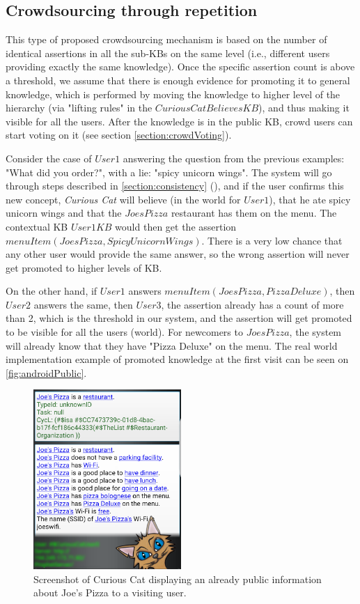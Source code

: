 \subsection{Crowdsourcing through repetition}
\label{section:crowdRepetition}
This type of proposed crowdsourcing mechanism is based on the number of 
identical assertions in all the sub-KBs on the same level (i.e., different 
users providing exactly the same knowledge). Once the specific assertion count 
is above a threshold, we assume that there is enough evidence for promoting it 
to general knowledge, which is performed by moving the knowledge to higher 
level of the hierarchy (via "lifting rules" in the $CuriousCatBelievesKB$), 
and thus making it visible for all the users. After the knowledge is in the 
public KB, crowd users can start voting on it (see section 
\ref{section:crowdVoting}).

Consider the case of $User1$ answering the question from the previous examples: 
"What did you order?", with a lie: "spicy unicorn wings". The system will go 
through steps described in \autoref{section:consistency}
(), and if the user confirms this new 
concept, \emph{Curious Cat} will believe (in the world for $User1$), that he 
ate spicy unicorn wings and that the $JoesPizza$ restaurant has them on the
menu. The contextual KB $User1KB$ would then get the assertion 
$menuItem(JoesPizza,SpicyUnicornWings)$. There is a very low chance that any 
other user would provide the same answer, so the wrong assertion will never get 
promoted to higher levels of KB.

On the other hand, if $User1$ answers $menuItem(JoesPizza,PizzaDeluxe)$, then 
$User2$ answers the same, then $User3$, the assertion already has a count of 
more than 2, which is the threshold in our system, and the assertion will get 
promoted to be visible for all the users (world). For newcomers to $JoesPizza$, 
the system will already know that they have "Pizza Deluxe" on the menu.
The real world implementation example of promoted knowledge at the first 
visit can be seen on \autoref{fig:androidPublic}.

\begin{figure}[h]
	\centering
		\includegraphics[width=0.5\textwidth]{figures/androidPublic.png}
	\caption{Screenshot of Curious Cat displaying an already public information about Joe's Pizza to a visiting user.}
	\label{fig:androidPublic}
\end{figure}

